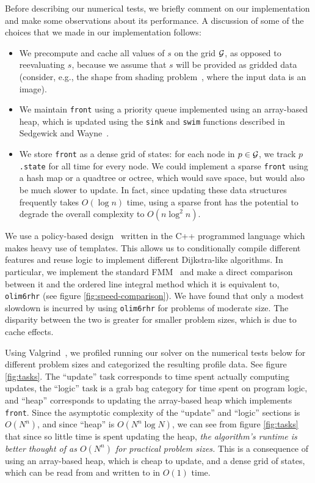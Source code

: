 \documentclass[smallcondensed]{svjour3}
\begin{document}
Before describing our numerical tests, we briefly comment on our
implementation and make some observations about its performance. A
discussion of some of the choices that we made in our implementation
follows:
\begin{itemize}
\item We precompute and cache all values of $s$ on the grid $\mathcal{G}$,
  as opposed to reevaluating $s$, because we assume that $s$ will be
  provided as gridded data (consider, e.g., the shape from shading
  problem~\cite{kimmel2001optimal}, where the input data is an image).
\item We maintain \texttt{front} using a priority queue implemented
  using an array-based heap, which is updated using the \texttt{sink}
  and \texttt{swim} functions described in Sedgewick and
  Wayne~\cite{sedgewick2011algorithms}.
\item We store \texttt{front} as a dense grid of states: for each node
  in $p \in \mathcal{G}$, we track $p$\texttt{.state} for all time for every
  node. We could implement a sparse \texttt{front} using a hash map or
  a quadtree or octree, which would save space, but would also be much
  slower to update. In fact, since updating these data structures
  frequently takes $O(\log n)$ time, using a sparse front has the
  potential to degrade the overall complexity to $O(n \log^2 n)$.
\end{itemize}

We use a policy-based design~\cite{alexandrescu2001modern} written in
the C++ programmed language which makes heavy use of templates. This
allows us to conditionally compile different features and reuse logic
to implement different Dijkstra-like algorithms. In particular, we
implement the standard FMM~\cite{sethian1996fast} and make a direct
comparison between it and the ordered line integral method which it is
equivalent to, \texttt{olim6rhr} (see figure
\ref{fig:speed-comparison}). We have found that only a modest slowdown
is incurred by using \texttt{olim6rhr} for problems of moderate
size. The disparity between the two is greater for smaller problem
sizes, which is due to cache effects.

Using Valgrind~\cite{nethercote2007valgrind}, we profiled running our
solver on the numerical tests below for different problem sizes and
categorized the resulting profile data. See figure
\ref{fig:tasks}. The ``update'' task corresponds to time spent
actually computing updates, the ``logic'' task is a grab bag category
for time spent on program logic, and ``heap'' corresponds to updating
the array-based heap which implements \texttt{front}. Since the
asymptotic complexity of the ``update'' and ``logic'' sections is
$O(N^n)$, and since ``heap'' is $O(N^n \log N)$, we can see from
figure \ref{fig:tasks} that since so little time is spent updating the
heap, \emph{the algorithm's runtime is better thought of as $O(N^n)$
  for practical problem sizes.} This is a consequence of using an
array-based heap, which is cheap to update, and a dense grid of
states, which can be read from and written to in $O(1)$ time.
\end{document}
